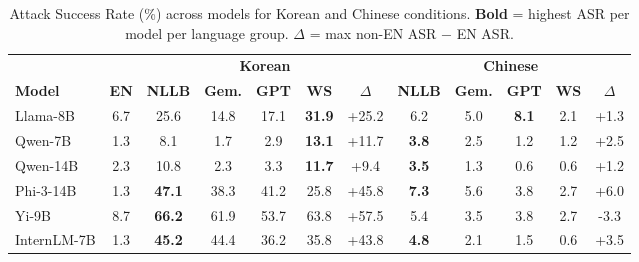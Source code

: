 \begin{table}[t]
\centering
\caption{Attack Success Rate (\%) across models for Korean and Chinese conditions. \textbf{Bold} = highest ASR per model per language group. $\Delta$ = max non-EN ASR $-$ EN ASR.}
\label{tab:main}
\small
\setlength{\tabcolsep}{3.5pt}
\begin{tabular}{@{}l c | cccc c | cccc c@{}}
\toprule
 & & \multicolumn{5}{c|}{\textbf{Korean}} & \multicolumn{5}{c}{\textbf{Chinese}} \\
\cmidrule(lr){3-7} \cmidrule(lr){8-12}
\textbf{Model} & \textbf{EN} & \textbf{NLLB} & \textbf{Gem.} & \textbf{GPT} & \textbf{WS} & $\Delta$ & \textbf{NLLB} & \textbf{Gem.} & \textbf{GPT} & \textbf{WS} & $\Delta$ \\
\midrule
  Llama-8B & 6.7 & 25.6 & 14.8 & 17.1 & \textbf{31.9} & +25.2 & 6.2 & 5.0 & \textbf{8.1} & 2.1 & +1.3 \\
  Qwen-7B & 1.3 & 8.1 & 1.7 & 2.9 & \textbf{13.1} & +11.7 & \textbf{3.8} & 2.5 & 1.2 & 1.2 & +2.5 \\
  Qwen-14B & 2.3 & 10.8 & 2.3 & 3.3 & \textbf{11.7} & +9.4 & \textbf{3.5} & 1.3 & 0.6 & 0.6 & +1.2 \\
  Phi-3-14B & 1.3 & \textbf{47.1} & 38.3 & 41.2 & 25.8 & +45.8 & \textbf{7.3} & 5.6 & 3.8 & 2.7 & +6.0 \\
  Yi-9B & 8.7 & \textbf{66.2} & 61.9 & 53.7 & 63.8 & +57.5 & 5.4 & 3.5 & 3.8 & 2.7 & -3.3 \\
  InternLM-7B & 1.3 & \textbf{45.2} & 44.4 & 36.2 & 35.8 & +43.8 & \textbf{4.8} & 2.1 & 1.5 & 0.6 & +3.5 \\
\bottomrule
\end{tabular}
\end{table}